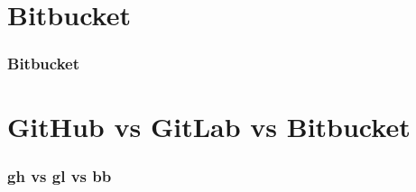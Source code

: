 \documentclass[12pt, hyperref={unicode}]{beamer}
\begin{document}


\section{Bitbucket}

\begin{frame}
	\frametitle{Bitbucket}
\end{frame}


\section{GitHub vs GitLab vs Bitbucket}

\begin{frame}
	\frametitle{gh vs gl vs bb}
\end{frame}
\end{document}
